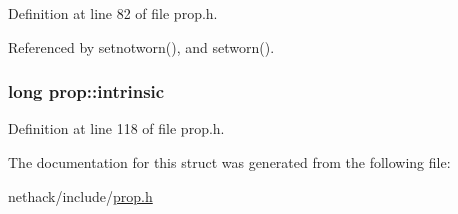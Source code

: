 Definition at line 82 of file prop.\+h.



Referenced by setnotworn(), and setworn().

\hypertarget{structprop_ae26d2e1345bcf7f2dae71b84869ff26c}{
\subsubsection[{intrinsic}]{\setlength{\rightskip}{0pt plus 5cm}long prop\+::intrinsic}}\label{structprop_ae26d2e1345bcf7f2dae71b84869ff26c}


Definition at line 118 of file prop.\+h.



The documentation for this struct was generated from the following file\+:\begin{DoxyCompactItemize}
\item 
nethack/include/\hyperlink{prop_8h}{prop.\+h}\end{DoxyCompactItemize}
